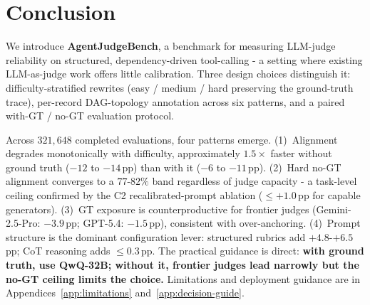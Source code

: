 \section{Conclusion}
\label{sec:conclusion}
We introduce \textbf{AgentJudgeBench}, a benchmark for measuring LLM-judge reliability on structured, dependency-driven tool-calling - a setting where existing LLM-as-judge work offers little calibration. Three design choices distinguish it: difficulty-stratified rewrites (easy / medium / hard preserving the ground-truth trace), per-record DAG-topology annotation across six patterns, and a paired with-GT / no-GT evaluation protocol.

Across $321{,}648$ completed evaluations, four patterns emerge. (1)~Alignment degrades monotonically with difficulty, approximately $1.5\times$ faster without ground truth ($-12$ to $-14$\,pp) than with it ($-6$ to $-11$\,pp). (2)~Hard no-GT alignment converges to a $77$-$82\%$ band regardless of judge capacity - a task-level ceiling confirmed by the C2 recalibrated-prompt ablation (${\leq}{+1.0}$\,pp for capable generators). (3)~GT exposure is counterproductive for frontier judges (Gemini-2.5-Pro: $-3.9$\,pp; GPT-5.4: $-1.5$\,pp), consistent with over-anchoring. (4)~Prompt structure is the dominant configuration lever: structured rubrics add $+4.8$-$+6.5$\,pp; CoT reasoning adds ${\leq}0.3$\,pp. The practical guidance is direct: \textbf{with ground truth, use QwQ-32B; without it, frontier judges lead narrowly but the no-GT ceiling limits the choice.} Limitations and deployment guidance are in Appendices~\ref{app:limitations} and~\ref{app:decision-guide}.